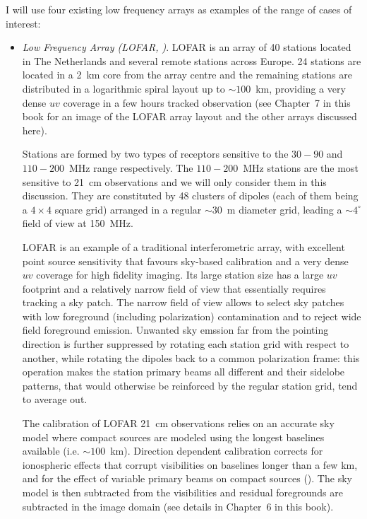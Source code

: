 {I will use four existing low frequency arrays as examples of the range of cases of interest:
\begin{itemize}

\item {\it Low Frequency Array (LOFAR, \cite{vanhaarlem13})}. LOFAR is an array of 40 stations located in The Netherlands and several remote stations across Europe. 24 stations are located in a 2~km core from the array centre and the remaining stations are distributed in a logarithmic spiral layout up to $\sim 100$~km, providing a very dense $uv$ coverage in a few hours tracked observation (see Chapter~7 in this book for an image of the LOFAR array layout and the other arrays discussed here).

Stations are formed by two types of receptors sensitive to the $30-90$ and $110-200$~MHz range respectively. The $110-200$~MHz stations are the most sensitive to 21~cm observations and we will only consider them in this discussion. They are constituted by 48 clusters of dipoles (each of them being a $4 \times 4$ square grid) arranged in a regular $\sim 30$~m diameter grid, leading a $\sim 4^\circ$ field of view at 150~MHz.

LOFAR is an example of a traditional interferometric array, with excellent point source sensitivity that favours sky-based calibration and a very dense $uv$ coverage for high fidelity imaging. Its large station size has a large $uv$ footprint and a relatively narrow field of view that essentially requires tracking a sky patch. The narrow field of view allows to select sky patches with low foreground (including polarization) contamination and to reject wide field foreground emission. Unwanted sky emssion far from the pointing direction is further suppressed by rotating each station grid with respect to another, while rotating the dipoles back to a common polarization frame: this operation makes the station primary beams all different and their sidelobe patterns, that would otherwise be reinforced by the regular station grid, tend to average out.

The calibration of LOFAR 21~cm observations relies on an accurate sky model where compact sources are modeled using the longest baselines available (i.e. $\sim 100$~km). Direction dependent calibration corrects for ionospheric effects that corrupt visibilities on baselines longer than a few km, and for the effect of variable primary beams on compact sources (\cite{yatawatta13}). The sky model is then subtracted from the visibilities and residual foregrounds are subtracted in the image domain (see details in Chapter~6 in this book). 


\end{itemize}}
